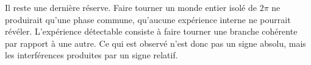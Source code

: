 Il reste une dernière réserve. Faire tourner un monde entier isolé de \(2\pi\) ne produirait qu’une phase commune, qu’aucune expérience interne ne pourrait révéler. L’expérience détectable consiste à faire tourner une branche cohérente par rapport à une autre. Ce qui est observé n’est donc pas un signe absolu, mais les interférences produites par un signe relatif.
